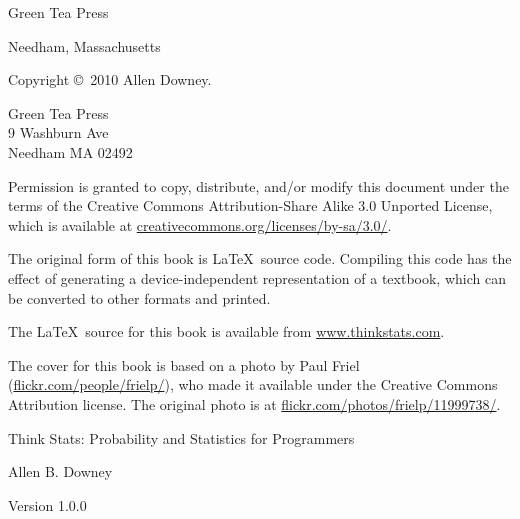 \documentclass[10pt]{book}
\newcommand{\thetitle}{Think Stats: Probability and Statistics for Programmers}
\newcommand{\theversion}{1.0.0}
\begin{document}
\begin{latexonly}
\begin{flushright}
\vspace{0.5in}

{\Large Green Tea Press}

{\small Needham, Massachusetts}

\vfill

\end{flushright}


\pagebreak
\thispagestyle{empty}

{\small
Copyright \copyright ~2010 Allen Downey.


\vspace{0.2in}

\begin{flushleft}
Green Tea Press       \\
9 Washburn Ave \\
Needham MA 02492
\end{flushleft}

Permission is granted to copy, distribute, and/or modify this document
under the terms of the Creative Commons Attribution-Share Alike 3.0 Unported
License, which is available at \url{creativecommons.org/licenses/by-sa/3.0/}.

The original form of this book is \LaTeX\ source code.  Compiling this
code has the effect of generating a device-independent representation
of a textbook, which can be converted to other formats and printed.

The \LaTeX\ source for this book is available from
\url{www.thinkstats.com}.

The cover for this book is based on a photo by Paul Friel
(\url{flickr.com/people/frielp/}), who made it available under
the Creative Commons Attribution license.  The original photo
is at \url{flickr.com/photos/frielp/11999738/}.

\vspace{0.2in}

} %

\end{latexonly}



\begin{htmlonly}


{\Large \thetitle}

{\large Allen B. Downey}

Version \theversion

\setcounter{chapter}{-1}

\end{htmlonly}
\end{document}
